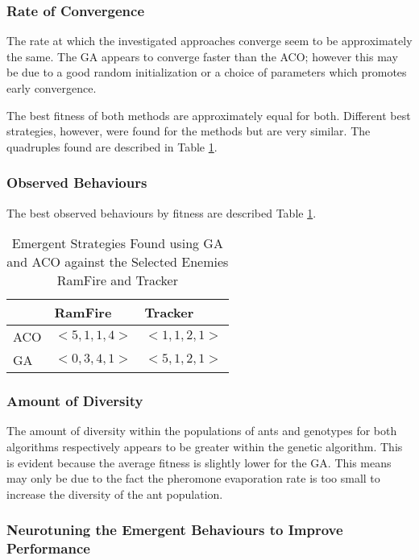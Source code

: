 
\subsubsection{Rate of Convergence}

The rate at which the investigated approaches converge seem to be approximately the same. The GA appears to converge faster than the ACO; however this may be due to a good random initialization or a choice of parameters which promotes early convergence.

The best fitness of both methods are approximately equal for both. Different best strategies, however, were found for the methods but are very similar. The quadruples found are described in Table \ref{foundstrats}.


\FigStrategyvRamFire
\FigStrategyvTracker

\subsubsection{Observed Behaviours}

The best observed behaviours by fitness are described Table \ref{foundstrats}.

\begin{table}
\centering
\begin{tabular}{|l|l|l|}
\hline
 & RamFire & Tracker \\
\hline
ACO & $<5, 1, 1, 4>$ & $<1, 1, 2, 1>$ \\
\hline
GA & $<0, 3, 4, 1>$ & $<5, 1, 2, 1>$ \\
\hline
\end{tabular}
\caption{Emergent Strategies Found using GA and ACO against the Selected Enemies RamFire and Tracker}
\label{foundstrats}
\end{table}

\subsubsection{Amount of Diversity}

The amount of diversity within the populations of ants and genotypes for both algorithms respectively appears to be greater within the genetic algorithm. This is evident because the average fitness is slightly lower for the GA. This means may only be due to the fact the pheromone evaporation rate is too small to increase the diversity of the ant population.

\subsubsection{Neurotuning the Emergent Behaviours to Improve Performance}

